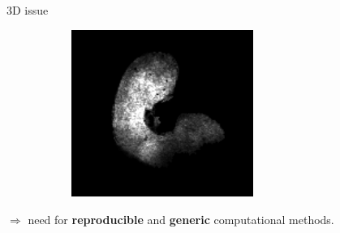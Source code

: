 \documentclass[10pt]{beamer}
\begin{document}
\begin{frame}{3D issue}
\begin{figure}[ht]
\begin{subfigure}[c]{0.3\textwidth}
     \end{subfigure}%
     \begin{subfigure}[c]{0.3\textwidth}
       \centering
       \includegraphics[width=0.65\textwidth]{fig/3D_segmentation0006}%
     \end{subfigure}
     
   \end{figure}

 {
  $\Rightarrow$ need for \textbf{reproducible} and
  \textbf{generic} computational methods.
}




    
\end{frame}


  


\end{document}
